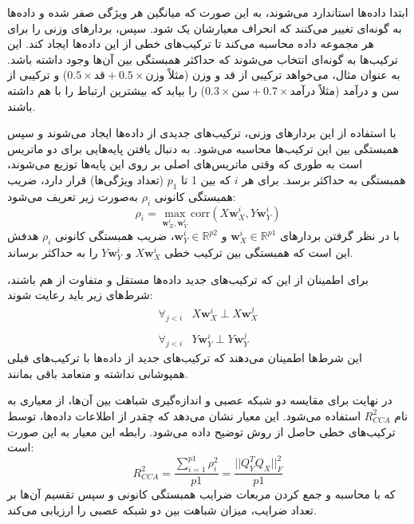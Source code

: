 ابتدا داده‌ها استاندارد می‌شوند، به این صورت که میانگین هر ویژگی صفر شده و داده‌ها به گونه‌ای تغییر می‌کنند که انحراف معیارشان یک شود. سپس،
بردارهای وزنی را برای هر مجموعه داده محاسبه می‌کند تا ترکیب‌های خطی از این داده‌ها ایجاد کند. این ترکیب‌ها به گونه‌ای انتخاب می‌شوند که حداکثر همبستگی بین آن‌ها وجود داشته باشد. به عنوان مثال،
می‌خواهد ترکیبی از قد و وزن (مثلاً \(0.5 \times \text{قد} + 0.5 \times \text{وزن}\)) و ترکیبی از سن و درآمد (مثلاً \(0.3 \times \text{سن} + 0.7 \times \text{درآمد}\)) را بیابد که بیشترین ارتباط را با هم داشته باشند.

با استفاده از این بردارهای وزنی، ترکیب‌های جدیدی از داده‌ها ایجاد می‌شوند و سپس همبستگی بین این ترکیب‌ها محاسبه می‌شود.
به دنبال یافتن پایه‌هایی برای دو ماتریس است به طوری که وقتی ماتریس‌های اصلی بر روی این پایه‌ها توزیع می‌شوند، همبستگی به حداکثر برسد. برای هر \(i\) که بین 1 تا \(p_1\) (تعداد ویژگی‌ها) قرار دارد، ضریب همبستگی کانونی \( \rho_i \) به‌صورت زیر تعریف می‌شود: 
\begin{equation}
	\rho_i = \max_{\mathbf{w}_X^i, \mathbf{w}_Y^i} \text{corr}(X \mathbf{w}_X^i, Y \mathbf{w}_Y^i)
\end{equation}
با در نظر گرفتن بردارهای \(\mathbf{w}_X^i \in \mathbb{R}^{p1}\) و \(\mathbf{w}_Y^i \in \mathbb{R}^{p2}\)، ضریب همبستگی کانونی \( \rho_i \) هدفش این است که همبستگی بین ترکیب خطی \( X \mathbf{w}_X^i \) و \( Y \mathbf{w}_Y^i \) را به حداکثر برساند.

برای اطمینان از این که ترکیب‌های جدید داده‌ها مستقل و متفاوت از هم باشند، شرط‌های زیر باید رعایت شوند:
\begin{equation}
	\begin{array}{ll}
		\forall_{j<i} & X \mathbf{w}_X^i \perp X \mathbf{w}_X^j
		\\
		\\
		\forall_{j<i} & Y \mathbf{w}_Y^i \perp Y \mathbf{w}_Y^j
	\end{array}
\end{equation}
این شرط‌ها اطمینان می‌دهند که ترکیب‌های جدید از داده‌ها با ترکیب‌های قبلی همپوشانی نداشته و متعامد باقی بمانند.

در نهایت برای مقایسه دو شبکه عصبی و اندازه‌گیری شباهت بین آن‌ها، از معیاری به نام \( R^2_{CCA} \) استفاده می‌شود. این معیار نشان می‌دهد که چقدر از اطلاعات داده‌ها، توسط ترکیب‌های خطی حاصل از روش
توضیح داده می‌شود. رابطه این معیار به این صورت است:
\begin{equation}
	R^2_{CCA} = \frac{\sum_{i=1}^{p1} \rho^2_i}{p1} = \frac{||Q^T_Y Q_X||^2_F}{p1}
	\label{eq_CCA}
\end{equation}
که با محاسبه و جمع کردن مربعات ضرایب همبستگی کانونی و سپس تقسیم آن‌ها بر تعداد ضرایب، میزان شباهت بین دو شبکه عصبی را ارزیابی می‌کند.

